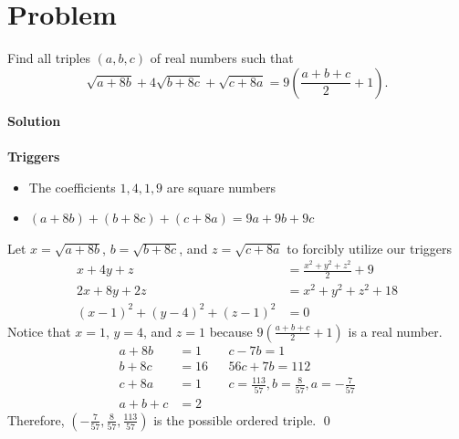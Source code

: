\documentclass{article}
\newenvironment{solution}{\begin{trivlist}\item[]{\bf Solution}}{\qed \end{trivlist}}
\begin{document}
\section*{Problem}
Find all triples $(a, b, c)$ of real numbers such that
\[
\sqrt{a + 8b} + 4\sqrt{b + 8c} + \sqrt{c + 8a} = 9 \left( \frac{a + b + c}{2} + 1 \right).
\]
\begin{solution}
\\\\
\textbf{Triggers}
\begin{itemize}
  \item The coefficients $1, 4, 1, 9$ are square numbers
  \item $(a + 8b) + (b + 8c) + (c + 8a) = 9a + 9b + 9c$
\end{itemize}
Let $x = \sqrt{a + 8b}$, $b = \sqrt{b + 8c}$, and $z = \sqrt{c + 8a}$ to forcibly utilize our triggers
\begin{align*}
    x + 4y + z &= \frac{x^2 + y^2 + z^2}{2} + 9 \\
    2x + 8y + 2z &= x^2 + y^2 + z^2 + 18 \\
    (x - 1)^2 + (y - 4)^2 + (z - 1)^2 &= 0
\end{align*}
Notice that $x = 1$, $y = 4$, and $z = 1$ because $9 \left( \frac{a + b + c}{2} + 1 \right)$ is a real number.
\begin{align*}
    a + 8b &= 1 && c - 7b = 1 \\
    b + 8c &= 16 &&56c + 7b = 112 \\
    c + 8a &= 1 &&c = \frac{113}{57}, b = \frac{8}{57}, a = -\frac{7}{57} \\
    a + b + c &= 2
\end{align*}
Therefore, $\boxed{\left(-\frac{7}{57}, \frac{8}{57}, \frac{113}{57} \right)}$ is the possible ordered triple.
\end{solution}

\newpage
\end{document}

